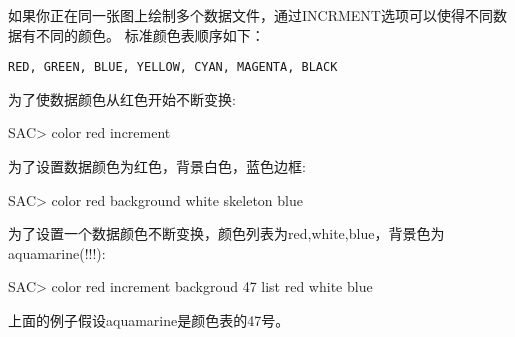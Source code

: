 如果你正在同一张图上绘制多个数据文件，通过INCRMENT选项可以使得不同数据有不同的颜色。
标准颜色表顺序如下：
\begin{verbatim}
RED, GREEN, BLUE, YELLOW, CYAN, MAGENTA, BLACK
\end{verbatim}

为了使数据颜色从红色开始不断变换:
\begin{SACCode}
SAC> color red increment
\end{SACCode}

为了设置数据颜色为红色，背景白色，蓝色边框:
\begin{SACCode}
SAC> color red background white skeleton blue
\end{SACCode}

为了设置一个数据颜色不断变换，颜色列表为red,white,blue，背景色为aquamarine(!!!):
\begin{SACCode}
SAC> color red increment backgroud 47 list red white blue
\end{SACCode}
上面的例子假设aquamarine是颜色表的47号。
